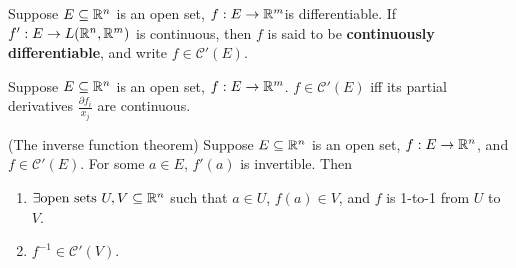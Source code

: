     \begin{defi}
        Suppose $E \subseteq \mathbb{R}^n$ is an open set, $f: E \to \mathbb{R}^m$is differentiable. If $f': E \to L(\mathbb{R}^n, \mathbb{R}^m)$ is continuous, then $f$ is said to be \textbf{continuously differentiable}, and write $f \in \mathscr{C}'(E)$.
    \end{defi}

    \begin{theo}
        Suppose $E \subseteq \mathbb{R}^n$ is an open set, $f: E \to \mathbb{R}^m$. $f \in \mathscr{C}'(E)$ iff its partial derivatives $\frac{\partial f_i}{x_j}$ are continuous.
    \end{theo}

    \begin{theo}
        (The inverse function theorem) Suppose $E \subseteq \mathbb{R}^n$ is an open set, $f: E \to \mathbb{R}^n$, and $f \in \mathscr{C}'(E)$. For some $a \in E$, $f'(a) $ is invertible. Then
        \begin{enumerate}
            \item $\exists \text{open sets }U,V \subseteq \mathbb{R}^n$ such that $a \in U$, $f(a) \in V$, and $f$ is 1-to-1 from $U$ to $V$. 

            \item $f^{-1} \in \mathscr{C}'(V)$.
        \end{enumerate} 
    \end{theo}

